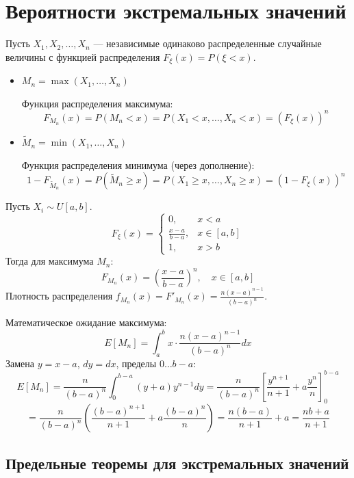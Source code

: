 \section{Вероятности экстремальных значений}

Пусть $X_1, X_2, \dots, X_n$ --- независимые одинаково распределенные случайные величины с функцией распределения $F_\xi(x) = P(\xi < x)$.

\begin{definition}
\leavevmode 
\begin{itemize}
    \item $M_n = \max(X_1, \dots, X_n)$
    
    Функция распределения максимума:
    \[ F_{M_n}(x) = P(M_n < x) = P(X_1 < x, \dots, X_n < x) = (F_\xi(x))^n \]
    
    \item $\tilde{M}_n = \min(X_1, \dots, X_n)$
    
    Функция распределения минимума (через дополнение):
    \[ 1 - F_{\tilde{M}_n}(x) = P(\tilde{M}_n \ge x) = P(X_1 \ge x, \dots, X_n \ge x) = (1 - F_\xi(x))^n \]
\end{itemize}
\end{definition}

\begin{example}
Пусть $X_i \sim U[a, b]$.
$$ F_\xi(x) = \begin{cases} 0, & x < a \\ \frac{x-a}{b-a}, & x \in [a, b] \\ 1, & x > b \end{cases} $$
Тогда для максимума $M_n$:
$$ F_{M_n}(x) = \left( \frac{x-a}{b-a} \right)^n, \quad x \in [a, b] $$
Плотность распределения $f_{M_n}(x) = F'_{M_n}(x) = \frac{n(x-a)^{n-1}}{(b-a)^n}$.

Математическое ожидание максимума:
$$ E[M_n] = \int_a^b x \cdot \frac{n(x-a)^{n-1}}{(b-a)^n} dx $$
Замена $y = x-a$, $dy=dx$, пределы $0 \dots b-a$:
$$ E[M_n] = \frac{n}{(b-a)^n} \int_0^{b-a} (y+a)y^{n-1} dy = \frac{n}{(b-a)^n} \left[ \frac{y^{n+1}}{n+1} + a\frac{y^n}{n} \right]_0^{b-a} $$
$$ = \frac{n}{(b-a)^n} \left( \frac{(b-a)^{n+1}}{n+1} + a\frac{(b-a)^n}{n} \right) = \frac{n(b-a)}{n+1} + a = \frac{nb + a}{n+1} $$
\end{example}


\subsection{Предельные теоремы для экстремальных значений}

